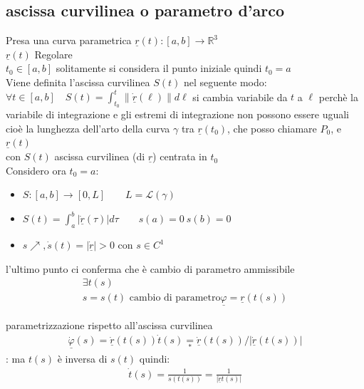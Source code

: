 \documentclass[a4paper, oneside]{article}
\begin{document}
\subsection{ascissa curvilinea o parametro d'arco}
\begin{definition}
    Presa una curva parametrica $\underline{r}(t):[a,b] \to \mathbb{R}^3$\\
     $\underline{r}(t)$ Regolare\\
     $t_0 \in [a,b]$ \tiny solitamente si considera il punto iniziale quindi $t_0 = a$\normalsize \\
    Viene definita l'ascissa curvilinea $S(t)$ nel seguente modo:\\ $\forall t \in [a,b] \quad S(t) = \int_{t_0}^{t}  \left\lVert \underline{\dot{r}}(\ell)\right\rVert  d\ell$ \tiny si cambia variabile da $t$ a $\ell$ perchè la variabile di integrazione e gli estremi di integrazione non possono essere uguali\normalsize\\
    cioè la lunghezza dell'arto della curva $\gamma$ tra $\underline{r}(t_0)$, che posso chiamare $P_0$, e $\underline{r}(t)$\\
    con $S(t)$ ascissa curvilinea (di $\underline{r}$) centrata in $t_0$ \\
    Considero ora $t_0 = a$:
    \begin{itemize}
        \item $S:[a,b] \to [0,L] \qquad L = \mathcal{L}(\gamma)$
        \item $S(t) = \int_{a}^{b} | \underline{\dot{r}} (\tau)| d\tau \qquad s(a) = 0 \ s(b) = 0$
        \item $s \nearrow , \dot{s}(t) = | \underline{\dot{r}} |> 0$ con $s \in C^1 $
    \end{itemize}
    l'ultimo punto ci conferma che è cambio di parametro ammissibile
\begin{gather*}
    \exists t(s)\\
    s= s(t) \text{ cambio di parametro}
    \boxed{\underline{\varphi} = \underline{r}(t(s))}
\end{gather*}
\end{definition}
parametrizzazione rispetto all'ascissa curvilinea
\begin{gather*}
    \underline{\dot{\varphi}}(s) = \underline{\dot{r}}(t(s)) \dot{t}(s) \underset{\boxed{*}}{=} \underline{\dot{r}}(t(s)) / |\underline{\dot{r}}(t(s))|
\end{gather*}
\fbox{*}: ma $t(s)$ è inversa di $s(t)$ quindi:
\begin{gather*}
    \dot{t}(s) = \frac{1}{\dot{s}(t(s))} = \frac{1}{| \underline{\dot{r}} t(s) |}
\end{gather*}
\end{document}
